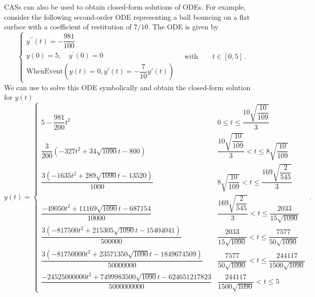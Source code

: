 \begin{example}
\acp{CAS} can also be used to obtain closed-form solutions of \acp{ODE}. For example, consider the following second-order \ac{ODE} representing a ball bouncing on a flat surface with a coefficient of restitution of $7/10$. The \ac{ODE} is given by
%
\begin{equation*}
  \begin{cases}
    y^{\prime\prime}(t) = -\dfrac{981}{100} \\[0.1em]
    y(0) = 5, \quad y^{\prime}(0) = 0 \\[0.1em]
    \mathrm{WhenEvent}(y(t) = 0, y'(t) = -\dfrac{7}{10}y'(t))
  \end{cases}
  \quad \text{with} \qquad t \in [0, 5] \, \text{.}
\end{equation*}
%
We can use \Mathematica{} to solve this \ac{ODE} symbolically and obtain the closed-form solution for $y(t)$
%
\begin{equation}
  y(t) = \begin{cases}
    5-\dfrac{981}{200}t^2 &
      0\leq t\leq \dfrac{10 \sqrt{\dfrac{10}{109}}}{3} \\[0.1em]
    \dfrac{3}{200} \left(-327 t^2+34 \sqrt{1090} t-800\right) &
      \dfrac{10\sqrt{\dfrac{10}{109}}}{3}<t\leq 8 \sqrt{\dfrac{10}{109}} \\[0.1em]
    \dfrac{3 \left(-1635 t^2+289 \sqrt{1090} t-13520\right)}{1000} &
      8\sqrt{\dfrac{10}{109}}<t\leq \dfrac{169 \sqrt{\dfrac{2}{545}}}{3} \\[0.1em]
    \dfrac{-49050 t^2+11169 \sqrt{1090} t-687154}{10000} &
      \dfrac{169\sqrt{\dfrac{2}{545}}}{3}<t\leq \dfrac{2033}{15 \sqrt{1090}} \\[0.1em]
    \dfrac{3 \left(-817500 t^2+215305 \sqrt{1090} t-15404041\right)}{500000} &
      \dfrac{2033}{15\sqrt{1090}}<t\leq \dfrac{7577}{50 \sqrt{1090}} \\[0.1em]
    \dfrac{3 \left(-81750000 t^2+23571350 \sqrt{1090} t-1849674509\right)}{50000000} &
      \dfrac{7577}{50 \sqrt{1090}}<t\leq \dfrac{244117}{1500 \sqrt{1090}} \\[0.1em]
    \dfrac{-24525000000 t^2+7499983500 \sqrt{1090} t-624651217823}{5000000000} &
      \dfrac{244117}{1500 \sqrt{1090}}<t\leq 5
    \end{cases} \, \text{.}
\end{equation}


\end{example}
